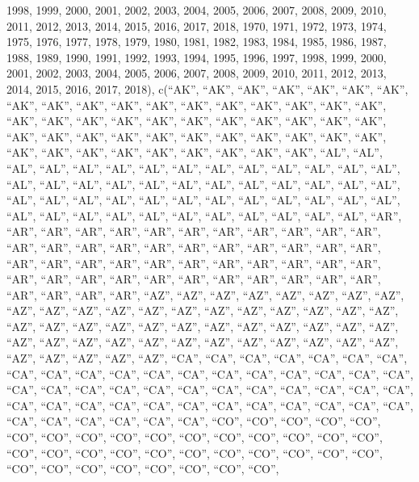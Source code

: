 \documentclass[
]{article}
\begin{document}
1998, 1999, 2000, 2001, 2002, 2003, 2004, 2005, 2006, 2007, 2008, 2009,
2010, 2011, 2012, 2013, 2014, 2015, 2016, 2017, 2018, 1970, 1971, 1972,
1973, 1974, 1975, 1976, 1977, 1978, 1979, 1980, 1981, 1982, 1983, 1984,
1985, 1986, 1987, 1988, 1989, 1990, 1991, 1992, 1993, 1994, 1995, 1996,
1997, 1998, 1999, 2000, 2001, 2002, 2003, 2004, 2005, 2006, 2007, 2008,
2009, 2010, 2011, 2012, 2013, 2014, 2015, 2016, 2017, 2018), c(``AK'',
``AK'', ``AK'', ``AK'', ``AK'', ``AK'', ``AK'', ``AK'', ``AK'', ``AK'',
``AK'', ``AK'', ``AK'', ``AK'', ``AK'', ``AK'', ``AK'', ``AK'', ``AK'',
``AK'', ``AK'', ``AK'', ``AK'', ``AK'', ``AK'', ``AK'', ``AK'', ``AK'',
``AK'', ``AK'', ``AK'', ``AK'', ``AK'', ``AK'', ``AK'', ``AK'', ``AK'',
``AK'', ``AK'', ``AK'', ``AK'', ``AK'', ``AK'', ``AK'', ``AK'', ``AK'',
``AK'', ``AK'', ``AK'', ``AL'', ``AL'', ``AL'', ``AL'', ``AL'', ``AL'',
``AL'', ``AL'', ``AL'', ``AL'', ``AL'', ``AL'', ``AL'', ``AL'', ``AL'',
``AL'', ``AL'', ``AL'', ``AL'', ``AL'', ``AL'', ``AL'', ``AL'', ``AL'',
``AL'', ``AL'', ``AL'', ``AL'', ``AL'', ``AL'', ``AL'', ``AL'', ``AL'',
``AL'', ``AL'', ``AL'', ``AL'', ``AL'', ``AL'', ``AL'', ``AL'', ``AL'',
``AL'', ``AL'', ``AL'', ``AL'', ``AL'', ``AL'', ``AL'', ``AR'', ``AR'',
``AR'', ``AR'', ``AR'', ``AR'', ``AR'', ``AR'', ``AR'', ``AR'', ``AR'',
``AR'', ``AR'', ``AR'', ``AR'', ``AR'', ``AR'', ``AR'', ``AR'', ``AR'',
``AR'', ``AR'', ``AR'', ``AR'', ``AR'', ``AR'', ``AR'', ``AR'', ``AR'',
``AR'', ``AR'', ``AR'', ``AR'', ``AR'', ``AR'', ``AR'', ``AR'', ``AR'',
``AR'', ``AR'', ``AR'', ``AR'', ``AR'', ``AR'', ``AR'', ``AR'', ``AR'',
``AR'', ``AR'', ``AZ'', ``AZ'', ``AZ'', ``AZ'', ``AZ'', ``AZ'', ``AZ'',
``AZ'', ``AZ'', ``AZ'', ``AZ'', ``AZ'', ``AZ'', ``AZ'', ``AZ'', ``AZ'',
``AZ'', ``AZ'', ``AZ'', ``AZ'', ``AZ'', ``AZ'', ``AZ'', ``AZ'', ``AZ'',
``AZ'', ``AZ'', ``AZ'', ``AZ'', ``AZ'', ``AZ'', ``AZ'', ``AZ'', ``AZ'',
``AZ'', ``AZ'', ``AZ'', ``AZ'', ``AZ'', ``AZ'', ``AZ'', ``AZ'', ``AZ'',
``AZ'', ``AZ'', ``AZ'', ``AZ'', ``AZ'', ``AZ'', ``CA'', ``CA'', ``CA'',
``CA'', ``CA'', ``CA'', ``CA'', ``CA'', ``CA'', ``CA'', ``CA'', ``CA'',
``CA'', ``CA'', ``CA'', ``CA'', ``CA'', ``CA'', ``CA'', ``CA'', ``CA'',
``CA'', ``CA'', ``CA'', ``CA'', ``CA'', ``CA'', ``CA'', ``CA'', ``CA'',
``CA'', ``CA'', ``CA'', ``CA'', ``CA'', ``CA'', ``CA'', ``CA'', ``CA'',
``CA'', ``CA'', ``CA'', ``CA'', ``CA'', ``CA'', ``CA'', ``CA'', ``CA'',
``CA'', ``CO'', ``CO'', ``CO'', ``CO'', ``CO'', ``CO'', ``CO'', ``CO'',
``CO'', ``CO'', ``CO'', ``CO'', ``CO'', ``CO'', ``CO'', ``CO'', ``CO'',
``CO'', ``CO'', ``CO'', ``CO'', ``CO'', ``CO'', ``CO'', ``CO'', ``CO'',
``CO'', ``CO'', ``CO'', ``CO'', ``CO'', ``CO'', ``CO'', ``CO'', ``CO'',
\end{document}
